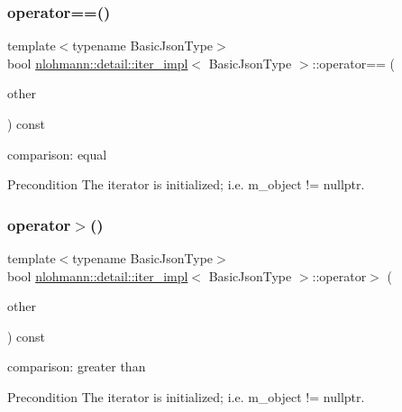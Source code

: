 \subsubsection{\texorpdfstring{operator==()}{operator==()}}
{\footnotesize\ttfamily template$<$typename Basic\+Json\+Type$>$ \\
bool \hyperlink{classnlohmann_1_1detail_1_1iter__impl}{nlohmann\+::detail\+::iter\+\_\+impl}$<$ Basic\+Json\+Type $>$\+::operator== (\begin{DoxyParamCaption}\item[{const \hyperlink{classnlohmann_1_1detail_1_1iter__impl}{iter\+\_\+impl}$<$ Basic\+Json\+Type $>$ \&}]{other }\end{DoxyParamCaption}) const\hspace{0.3cm}{\ttfamily [inline]}}



comparison\+: equal 

\begin{DoxyPrecond}{Precondition}
The iterator is initialized; i.\+e. {\ttfamily m\+\_\+object != nullptr}. 
\end{DoxyPrecond}
\mbox{\label{classnlohmann_1_1detail_1_1iter__impl_aaf3620b8dfa4bed8a9ac2b51dd55dbd7}} 
\subsubsection{\texorpdfstring{operator$>$()}{operator>()}}
{\footnotesize\ttfamily template$<$typename Basic\+Json\+Type$>$ \\
bool \hyperlink{classnlohmann_1_1detail_1_1iter__impl}{nlohmann\+::detail\+::iter\+\_\+impl}$<$ Basic\+Json\+Type $>$\+::operator$>$ (\begin{DoxyParamCaption}\item[{const \hyperlink{classnlohmann_1_1detail_1_1iter__impl}{iter\+\_\+impl}$<$ Basic\+Json\+Type $>$ \&}]{other }\end{DoxyParamCaption}) const\hspace{0.3cm}{\ttfamily [inline]}}



comparison\+: greater than 

\begin{DoxyPrecond}{Precondition}
The iterator is initialized; i.\+e. {\ttfamily m\+\_\+object != nullptr}. 
\end{DoxyPrecond}
\mbox{\label{classnlohmann_1_1detail_1_1iter__impl_a634f85da575cb60b012a687efa26e11a}} 

